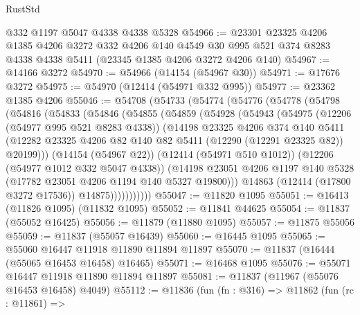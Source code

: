 \begin{lexlean}{RustStd}
\begin{coremodule}
    @332
    @1197
    @5047
    @4338
    @4338
    @5328
@54966 := @23301
    @23325
    @4206
    @1385
    @4206
    @3272
    @332
    @4206
    @140
    @4549
    @30
    @995
    @521
    @374
    @8283
    @4338
    @4338
    @5411
    (@23345 @1385 @4206 @3272 @4206 @140)
@54967 := @14166 @3272
@54970 := @54966 (@14154 (@54967 @30))
@54971 := @17676 @3272
@54975 := @54970 (@12414 (@54971 @332 @995))
@54977 := @23362 @1385 @4206
@55046 := @54708
    (@54733
      (@54774
        (@54776
          (@54778
            (@54798
              (@54816
                (@54833
                  (@54846
                    (@54855
                      (@54859
                        (@54928
                          (@54943
                            (@54975
                              (@12206 (@54977 @995 @521 @8283 @4338))
                              (@14198
                                @23325
                                @4206
                                @374
                                @140
                                @5411
                                (@12282
                                  @23325
                                  @4206
                                  @82
                                  @140
                                  @82
                                  @5411
                                  (@12290 (@12291 @23325 @82))
                                  @20199)))
                            (@14154 (@54967 @22))
                            (@12414 (@54971 @510 @1012))
                            (@12206 (@54977 @1012 @332 @5047 @4338))
                            (@14198
                              @23051
                              @4206
                              @1197
                              @140
                              @5328
                              (@17782 @23051 @4206 @1194 @140 @5327 @19800)))
                          @14863
                          (@12414 (@17800 @3272 @17536))
                          @14875)))))))))))
@55047 := @11820 @1095
@55051 := @16413 (@11826 @1095) (@11832 @1095)
@55052 := @11841 @44625
@55054 := @11837 (@55052 @16425)
@55056 := @11879 (@11880 @1095)
@55057 := @11875 @55056
@55059 := @11837 (@55057 @16439)
@55060 := @16445 @1095
@55065 := @55060 @16447 @11918 @11890 @11894 @11897
@55070 := @11837 (@16444 (@55065 @16453 @16458) @16465)
@55071 := @16468 @1095
@55076 := @55071 @16447 @11918 @11890 @11894 @11897
@55081 := @11837 (@11967 (@55076 @16453 @16458) @4049)
@55112 := @11836
    (fun (fn : @316) =>
    @11862
      (fun (rc : @11861) =>

\end{coremodule}
\end{lexlean}
